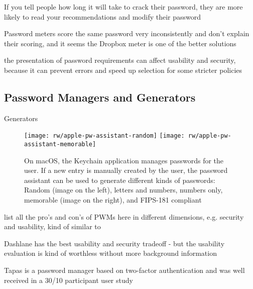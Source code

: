 	If you tell people how long it will take to crack their password, they are more likely to read your recommendations and modify their password \cite{Vance2013FearAppeals}
	
	Password meters score the same password very inconsistently and don't explain their scoring, and it seems the Dropbox meter is one of the better solutions \cite{Carnavalet2014AnalyzingPWStrengthMeters}
	
	the presentation of password requirements can affect usability and security, because it can prevent errors and speed up selection for some stricter policies \cite{Shay2015SpoonfulOfSugar}
	
	\subsection{Password Managers and Generators}
	
	Generators
	\begin{figure}
		\centering
		\texttt{[image: rw/apple-pw-assistant-random]}
		\texttt{[image: rw/apple-pw-assistant-memorable]}
		\caption{\label{fig:rw:pw_generators} On macOS, the Keychain application manages passwords for the user. If a new entry is manually created by the user, the password assistant can be used to generate different kinds of passwords: Random (image on the left), letters and numbers, numbers only, memorable (image on the right), and FIPS-181 compliant}
	\end{figure}
	
	
	
	list all the pro's and con's of PWMs here in different dimensions, e.g. security and usability, kind of similar to \cite{Bonneau2012ReplacePasswords}
	
	Dashlane has the best usability and security tradeoff - but the usability evaluation is kind of worthless without more background information \cite{AriasCabarcos2016ComparingPWM}
	
	Tapas is a password manager based on two-factor authentication and was well received in a 30/10 participant user study \cite{McCarney2012Tapas, McCarney2013PWMThesis}
	
